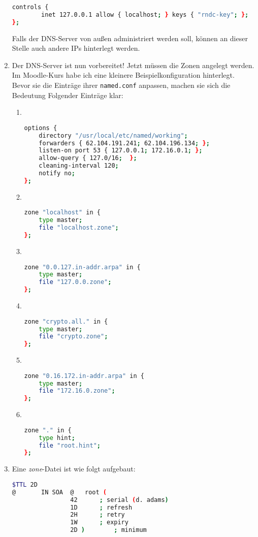 \documentclass[paper=a4,fontsize=11pt]{scrartcl}%
\numberwithin{equation}{section}
\begin{document}
\begin{enumerate}
\begin{lstlisting}[style=Bash, language=Bash]
controls {
        inet 127.0.0.1 allow { localhost; } keys { "rndc-key"; };
};
\end{lstlisting}
Falls der DNS-Server von außen administriert werden soll, können an dieser Stelle auch andere IPs hinterlegt werden.			
	\item Der DNS-Server ist nun vorbereitet! Jetzt müssen die Zonen angelegt werden. Im Moodle-Kurs habe ich eine kleinere Beispielkonfiguration hinterlegt.\\
	Bevor sie die Einträge ihrer \texttt{named.conf} anpassen, machen sie sich die Bedeutung Folgender Einträge klar:
	\begin{enumerate}
		\item ~\\
\begin{lstlisting}[style=Bash, language=Bash]
options { 
	directory "/usr/local/etc/named/working"; 
	forwarders { 62.104.191.241; 62.104.196.134; };
	listen-on port 53 { 127.0.0.1; 172.16.0.1; };
	allow-query { 127.0/16;  };
	cleaning-interval 120;
	notify no;
};
\end{lstlisting}
		\item ~\\
\begin{lstlisting}[style=Bash, language=Bash]
zone "localhost" in {
	type master;
	file "localhost.zone";
};
\end{lstlisting}
		\item ~\\
\begin{lstlisting}[style=Bash, language=Bash]
zone "0.0.127.in-addr.arpa" in {
	type master;
	file "127.0.0.zone";
};
\end{lstlisting}
	\item ~\\
\begin{lstlisting}[style=Bash, language=Bash]
zone "crypto.all." in {
	type master;
	file "crypto.zone";
};
\end{lstlisting}
		\item ~\\
\begin{lstlisting}[style=Bash, language=Bash]
zone "0.16.172.in-addr.arpa" in {
	type master;
	file "172.16.0.zone";
};
	\end{lstlisting}
	\item ~\\
\begin{lstlisting}[style=Bash, language=Bash]
zone "." in {
	type hint;	
	file "root.hint";
};
\end{lstlisting}
	\end{enumerate}
	\item Eine \emph{zone}-Datei ist wie folgt aufgebaut:
\begin{lstlisting}[style=Bash, language=Bash]
$TTL 2D
@		IN SOA	@   root (
				42		; serial (d. adams)
				1D		; refresh
				2H		; retry
				1W		; expiry
				2D )		; minimum


\end{lstlisting}
\end{enumerate}
\end{document}

